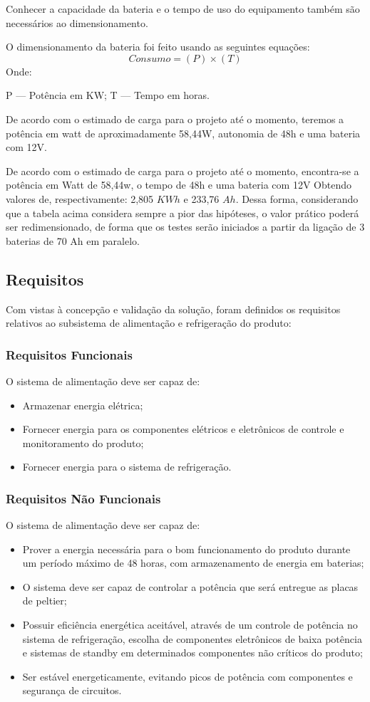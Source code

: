 Conhecer a capacidade da bateria e o tempo de uso do equipamento também são necessários ao dimensionamento.

O dimensionamento da bateria foi feito usando as seguintes equações:
\begin{equation}
Consumo = (P) \times (T)
\end{equation}
Onde: 

 P --- Potência em KW;
 T --- Tempo em horas.

De acordo com o estimado de carga para o projeto até o momento, teremos a potência em watt de aproximadamente 58,44W, autonomia de 48h e uma bateria com 12V. 

De acordo com o estimado de carga para o projeto até o momento, encontra-se a potência em Watt de 58,44w, o tempo de 48h e uma bateria com 12V  Obtendo valores de, respectivamente: 2,805 $KWh$ e 233,76 $Ah$. Dessa forma, considerando que a tabela acima considera sempre a pior das hipóteses, o valor prático poderá ser redimensionado, de forma que os testes serão iniciados a partir da ligação de 3 baterias de 70 Ah em paralelo.

\subsection{Requisitos}
Com vistas à concepção e validação da solução, foram definidos os requisitos relativos ao subsistema de alimentação e refrigeração do produto:

\subsubsection{Requisitos Funcionais}
O sistema de alimentação deve ser capaz de:
\begin{itemize}
\item Armazenar energia elétrica;
 \item Fornecer energia para os componentes elétricos e eletrônicos de controle e monitoramento do produto;
 \item Fornecer energia para o sistema de refrigeração.
 \end{itemize}
\subsubsection{Requisitos Não Funcionais}
O sistema de alimentação deve ser capaz de:
\begin{itemize}
\item Prover a energia necessária para o bom funcionamento do produto durante um período máximo de 48 horas, com armazenamento de energia em baterias;
\item O sistema deve ser capaz de controlar a potência que será entregue as placas de peltier;
 \item Possuir eficiência energética aceitável, através de um controle de potência no sistema de refrigeração, escolha de componentes eletrônicos de baixa potência e sistemas de standby em determinados componentes não críticos do produto;
 \item Ser estável energeticamente, evitando picos de potência com componentes e segurança de circuitos.
 \end{itemize}